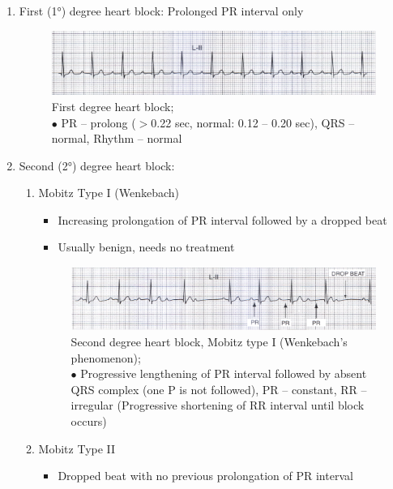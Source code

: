 \documentclass[11pt,a4paper]{report}
\begin{document}
\begin{enumerate}
\begin{enumerate}
		\item First (\ang{1}) degree heart block: Prolonged PR interval only  
		\begin{figure}[htp]
			\centering \includegraphics[scale=.85]{ecg-heartblock-1.png}
			\centering \caption[First degree heart block]{First degree heart block; \\$\bullet$ PR -- prolong ($>$0.22 sec, normal: 0.12 -- 0.20 sec), QRS -- normal, Rhythm -- normal \cite{abdullah-ecg}}
			\label{ecg-heartblock-1}
		\end{figure}
		\item Second (\ang{2}) degree heart block: 
		\begin{enumerate}
			\item Mobitz Type I (Wenkebach)
			\begin{itemize}
				\item Increasing prolongation of PR interval followed by a dropped beat 
				\item Usually benign, needs no treatment 
			\end{itemize}
			\begin{figure}[htp]
				\centering \includegraphics[scale=.9]{ecg-heartblock-2-mobitz-1.png}
				\centering \caption[Second degree heart block, Mobitz I]{Second degree heart block, Mobitz type I (Wenkebach's phenomenon); \\$\bullet$ Progressive lengthening of PR interval followed by absent QRS complex (one P is not followed), PR -- constant, RR -- irregular (Progressive shortening of RR interval until block occurs) \cite{abdullah-ecg}}
				\label{ecg-heartblock-1-mobitz-1}
			\end{figure}
			\item Mobitz Type II 
			\begin{itemize}
				\item Dropped beat with no previous prolongation of PR interval 

\end{itemize}
\end{enumerate}
\end{enumerate}
\end{enumerate}
\end{document}

